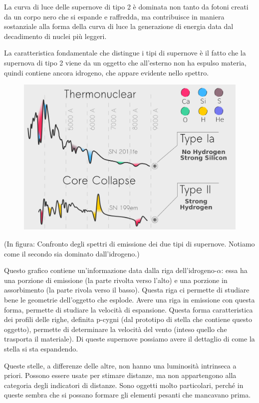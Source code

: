 La curva di luce delle supernove di tipo 2 è dominata non tanto da fotoni creati da un corpo nero che si espande e raffredda, ma contribuisce in maniera sostanziale alla forma della curva di luce la generazione di energia data dal decadimento di nuclei più leggeri.

La caratteristica fondamentale che distingue i tipi di supernove è il fatto che la supernova di tipo 2 viene da un oggetto che all'esterno non ha espulso materia, quindi contiene ancora idrogeno, che appare evidente nello spettro.

\begin{figure}[H]
    \centering
    \includegraphics[width=12cm]{immagini/confronto_spettri_superanova_1_e_2.png}
\end{figure}

(In figura: Confronto degli spettri di emissione dei due tipi di supernove. Notiamo come il secondo sia dominato dall'idrogeno.)

Questo grafico contiene un'informazione data dalla riga dell'idrogeno-$\alpha$: essa ha una porzione di emissione (la parte rivolta verso l'alto) e una porzione in assorbimento (la parte rivola verso il basso). Questa riga ci permette di studiare bene le geometrie dell'oggetto che esplode. Avere una riga in emissione con questa forma, permette di studiare la velocità di espansione. Questa forma caratteristica dei profili delle righe, definita p-cygni (dal prototipo di stella che contiene questo oggetto), permette di determinare la velocità del vento (inteso quello che trasporta il materiale). Di queste supernove possiamo avere il dettaglio di come la stella si sta espandendo.

Queste stelle, a differenze delle altre, non hanno una luminosità intrinseca a priori. Possono essere usate per stimare distanze, ma non appartengono alla categoria degli indicatori di distanze. Sono oggetti molto particolari, perché in queste sembra che si possano formare gli elementi pesanti che mancavano prima.

